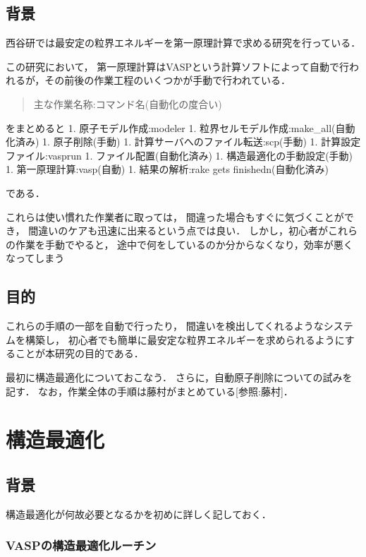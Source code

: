 \documentclass[11pt,dvipdfmx]{jsarticle}
\begin{document}
    \subsection{背景}\label{ux80ccux666f}

    西谷研では最安定の粒界エネルギーを第一原理計算で求める研究を行っている．

この研究において，
第一原理計算はVASPという計算ソフトによって自動で行われるが，その前後の作業工程のいくつかが手動で行われている．

\begin{quote}
主な作業名称:コマンド名(自動化の度合い)
\end{quote}
をまとめると 1. 原子モデル作成:modeler 1.
粒界セルモデル作成:make\_all(自動化済み) 1. 原子削除(手動) 1.
計算サーバへのファイル転送:scp(手動) 1. 計算設定ファイル:vasprun 1.
ファイル配置(自動化済み) 1. 構造最適化の手動設定(手動) 1.
第一原理計算:vasp(自動) 1. 結果の解析:rake gets finishedn(自動化済み)

である．

これらは使い慣れた作業者に取っては，
間違った場合もすぐに気づくことができ，
間違いのケアも迅速に出来るという点では良い．
しかし，初心者がこれらの作業を手動でやると，
途中で何をしているのか分からなくなり，効率が悪くなってしまう

\subsection{目的}\label{ux76eeux7684}

これらの手順の一部を自動で行ったり，
間違いを検出してくれるようなシステムを構築し，
初心者でも簡単に最安定な粒界エネルギーを求められるようにすることが本研究の目的である．

最初に構造最適化についておこなう．
さらに，自動原子削除についての試みを記す．
なお，作業全体の手順は藤村がまとめている{[}参照:藤村{]}．

    \section{構造最適化}\label{ux69cbux9020ux6700ux9069ux5316}

    \subsection{背景}\label{ux80ccux666f}

構造最適化が何故必要となるかを初めに詳しく記しておく．

    \subsubsection{VASPの構造最適化ルーチン}\label{vaspux306eux69cbux9020ux6700ux9069ux5316ux30ebux30fcux30c1ux30f3}
\end{document}
